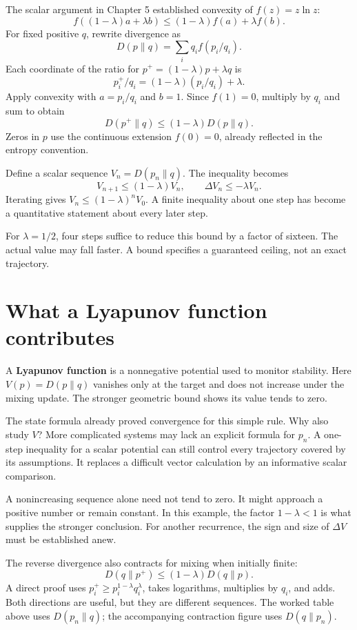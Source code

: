 \documentclass[11pt,oneside,openany]{book}
\theoremstyle{definition}
\theoremstyle{remark}
\numberwithin{equation}{chapter}
\begin{document}
The scalar argument in Chapter 5 established convexity of \(f(z)=z\ln z\): \[f((1-\lambda)a+\lambda b)
\leq(1-\lambda)f(a)+\lambda f(b).\] For fixed positive \(q\), rewrite divergence as \[D(p\|q)=\sum_i q_i f(p_i/q_i).\] Each coordinate of the ratio for \(p^+=(1-\lambda)p+\lambda q\) is \[p_i^+/q_i=(1-\lambda)(p_i/q_i)+\lambda.\] Apply convexity with \(a=p_i/q_i\) and \(b=1\). Since \(f(1)=0\), multiply by \(q_i\) and sum to obtain \[\boxed{D(p^+\|q)\leq(1-\lambda)D(p\|q).}\] Zeros in \(p\) use the continuous extension \(f(0)=0\), already reflected in the entropy convention.

Define a scalar sequence \(V_n=D(p_n\|q)\). The inequality becomes \[V_{n+1}\leq(1-\lambda)V_n,\qquad
\Delta V_n\leq-\lambda V_n.\] Iterating gives \(V_n\leq(1-\lambda)^nV_0\). A finite inequality about one step has become a quantitative statement about every later step.

For \(\lambda=1/2\), four steps suffice to reduce this bound by a factor of sixteen. The actual value may fall faster. A bound specifies a guaranteed ceiling, not an exact trajectory.

\section{What a Lyapunov function contributes}\label{ch06-what-a-lyapunov-function-contributes}

A \textbf{Lyapunov function} is a nonnegative potential used to monitor stability. Here \(V(p)=D(p\|q)\) vanishes only at the target and does not increase under the mixing update. The stronger geometric bound shows its value tends to zero.

The state formula already proved convergence for this simple rule. Why also study \(V\)? More complicated systems may lack an explicit formula for \(p_n\). A one-step inequality for a scalar potential can still control every trajectory covered by its assumptions. It replaces a difficult vector calculation by an informative scalar comparison.

A nonincreasing sequence alone need not tend to zero. It might approach a positive number or remain constant. In this example, the factor \(1-\lambda<1\) is what supplies the stronger conclusion. For another recurrence, the sign and size of \(\Delta V\) must be established anew.

The reverse divergence also contracts for mixing when initially finite: \[D(q\|p^+)\leq(1-\lambda)D(q\|p).\] A direct proof uses \(p_i^+\geq p_i^{1-\lambda}q_i^\lambda\), takes logarithms, multiplies by \(q_i\), and adds. Both directions are useful, but they are different sequences. The worked table above uses \(D(p_n\|q)\); the accompanying contraction figure uses \(D(q\|p_n)\).
\end{document}
